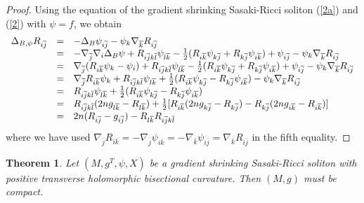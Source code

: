 \documentclass[12pt]{amsart}%
\newtheorem{theorem}{Theorem}
\numberwithin{equation}{section}
\begin{document}
\begin{proof}
Using the equation of the gradient shrinking Sasaki-Ricci soliton (\ref{2a})
and (\ref{2}) with $\psi=f$, we obtain%
\[%
\begin{array}
[c]{lll}%
\Delta_{B,\psi}R_{i\overline{j}} & = & -\Delta_{B}\psi_{i\overline{j}}%
-\psi_{k}\nabla_{\overline{k}}R_{i\overline{j}}\\
& = & -\nabla_{\overline{j}}\nabla_{i}\Delta_{B}\psi+R_{i\overline
{j}k\overline{l}}\psi_{l\overline{k}}-\frac{1}{2}(R_{i\overline{k}}%
\psi_{k\overline{j}}+R_{k\overline{j}}\psi_{i\overline{k}})+\psi
_{i\overline{j}}-\psi_{k}\nabla_{\overline{k}}R_{i\overline{j}}\\
& = & \nabla_{\overline{j}}(R_{i\overline{k}}\psi_{k}-\psi_{i})+R_{i\overline
{j}k\overline{l}}\psi_{l\overline{k}}-\frac{1}{2}(R_{i\overline{k}}%
\psi_{k\overline{j}}+R_{k\overline{j}}\psi_{i\overline{k}})+\psi
_{i\overline{j}}-\psi_{k}\nabla_{\overline{k}}R_{i\overline{j}}\\
& = & \nabla_{\overline{j}}R_{i\overline{k}}\psi_{k}+R_{i\overline
{j}k\overline{l}}\psi_{l\overline{k}}+\frac{1}{2}(R_{i\overline{k}}%
\psi_{k\overline{j}}-R_{k\overline{j}}\psi_{i\overline{k}})-\psi_{k}%
\nabla_{\overline{k}}R_{i\overline{j}}\\
& = & R_{i\overline{j}k\overline{l}}\psi_{l\overline{k}}+\frac{1}%
{2}(R_{i\overline{k}}\psi_{k\overline{j}}-R_{k\overline{j}}\psi_{i\overline
{k}})\\
& = & R_{i\overline{j}k\overline{l}}(2ng_{l\overline{k}}-R_{l\overline{k}%
})+\frac{1}{2}[R_{i\overline{k}}(2ng_{k\overline{j}}-R_{k\overline{j}%
})-R_{k\overline{j}}(2ng_{i\overline{k}}-R_{i\overline{k}})]\\
& = & 2n(R_{i\overline{j}}-g_{i\overline{j}})-R_{l\overline{k}}R_{i\overline
{j}k\overline{l}}%
\end{array}
\]
where we have used $\nabla_{\overline{j}}R_{i\overline{k}}=-\nabla
_{\overline{j}}\psi_{i\overline{k}}=-\nabla_{\overline{k}}\psi_{i\overline{j}%
}=\nabla_{\overline{k}}R_{i\overline{j}}$ in the fifth equality.
\end{proof}

\begin{theorem}
Let $(M,g^{T},\psi,X)$ be a gradient shrinking Sasaki-Ricci soliton with
positive transverse holomorphic bisectional curvature. Then $(M,g)$ must be compact.
\end{theorem}
\end{document}

